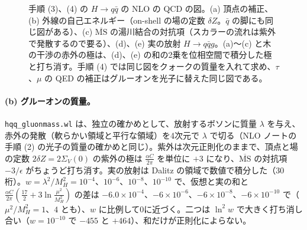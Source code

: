\documentclass[a4paper,10pt]{ltjsarticle}
\newcommand{\MSbar}{\overline{\mathrm{MS}}}
\begin{document}
\begin{figure}[tbp]
\caption{手順 (3)、(4) の $H\to q\bar q$ の NLO の QCD の図。(a) 頂点の補正、(b) 外線の自己エネルギー（on-shell の場の定数 $\delta Z$。$\bar q$ の脚にも同じ図がある）、(c) $\MSbar$ の湯川結合の対抗項（スカラーの流れは紫外で発散するので要る）、(d)、(e) 実の放射 $H\to q\bar qg$。(a)〜(c) と木の干渉の赤外の極は、(d)、(e) の和の2乗を位相空間で積分した極と打ち消す。手順 (4) では同じ図をクォークの質量を入れて求め、$\tau$、$\mu$ の QED の補正はグルーオンを光子に替えた同じ図である。}
\label{fig:hqqnlo}
\end{figure}

\paragraph{(b) グルーオンの質量。}\texttt{hqq\_gluonmass.wl} は、独立の確かめとして、放射するボソンに質量 $\lambda$ を与え、赤外の発散（軟らかい領域と平行な領域）を4次元で $\lambda$ で切る（NLO ノートの手順 (2) の光子の質量の確かめと同じ）。紫外は次元正則化のままで、頂点と場の定数 $2\delta Z=2\Sigma_V(0)$ の紫外の極は $\frac{\alpha C}{2\pi}$ を単位に $+3$ になり、$\MSbar$ の対抗項 $-3/\epsilon$ がちょうど打ち消す。実の放射は Dalitz の領域で数値で積分した（30桁）。$w=\lambda^2/M_H^2=10^{-4}$、$10^{-6}$、$10^{-8}$、$10^{-10}$ で、仮想と実の和と $\frac{\alpha C}{2\pi}(\frac{17}2+3\ln\frac{\mu^2}{M_H^2})$ の差は $-6.0\times10^{-4}$、$-6\times10^{-6}$、$-6\times10^{-8}$、$-6\times10^{-10}$ で（$\mu^2/M_H^2=1$、$4$ とも）、$w$ に比例して0に近づく。二つは $\ln^2w$ で大きく打ち消し合い（$w=10^{-10}$ で $-455$ と $+464$）、和だけが正則化によらない。
\end{document}
